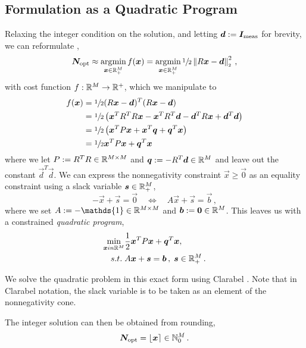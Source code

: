 \subsection{Formulation as a Quadratic Program}
Relaxing the integer condition on the solution, and letting $\vec{d} := \vec{I}_{\rm meas}$ for brevity, we can reformulate ,
$$\vec{N}_{\rm opt} \approx \argmin_{\vec{x} \in \R_+^M} f(\vec{x}) = \argmin_{\vec{x} \in \R_+^M} \sfrac{1}{2} \norm{R \vec{x} - \vec{d}}^2\,,$$
with cost function $f: \R^M \to \R^+$, which we manipulate to
\begin{align*}
  f(\vec{x}) & = \sfrac{1}{2} (R \vec{x} - \vec{d})^T (R \vec{x} - \vec{d})                                                          \\
             & = \sfrac{1}{2} \left(\vec{x}^T R^T R \vec{x} - \vec{x}^T R^T \vec{d} - \vec{d}^T R \vec{x} + \vec{d}^T \vec{d}\right) \\
             & = \sfrac{1}{2} \left(\vec{x}^T P \vec{x} + \vec{x}^T \vec{q} + \vec{q}^T \vec{x}\right)                               \\
             & = \sfrac{1}{2} \vec{x}^T P \vec{x} + \vec{q}^T \vec{x}
\end{align*}
where we let $P := R^T R \in \R^{M \times M}$ and $\vec{q} := -R^T \vec{d} \in \R^M$ and leave out the constant $\vec{d}^T \vec{d}$.
We can express the nonnegativity constraint $\vec{x} \ge \vec{0}$ as an equality constraint using a slack variable $\vec{s} \in \R_+^M$,
$$-\vec{x} + \vec{s} = \vec{0} \quad\Leftrightarrow\quad A \vec{x} + \vec{s} = \vec{b}\,,$$
where we set $A := -\mathds{1} \in \R^{M \times M}$ and $\vec{b} := \vec{0} \in \R^M$.
This leaves us with a constrained \textit{quadratic program},
\begin{align}
  \min_{\vec{x} in \R^M} & \frac{1}{2} \vec{x}^T P \vec{x} + \vec{q}^T \vec{x},     \\
  s.t.\;                 & A \vec{x} + \vec{s} = \vec{b}\,,\; \vec{s} \in \R_+^M\,.
\end{align}

We solve the quadratic problem in this exact form using Clarabel \cite{2024-clarabel}.
Note that in Clarabel notation, the slack variable is to be taken as an element of the nonnegativity cone.

The integer solution can then be obtained from rounding,
$$\vec{N}_{\rm opt} = \lfloor \vec{x} \rceil \in \N_0^M\,.$$

